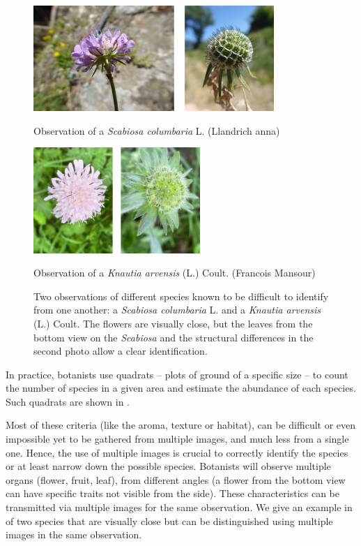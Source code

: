 \begin{figure}[bth]
        \centering
        \begin{minipage}[b]{0.49\textwidth}
            \centering
            \includegraphics[width=\textwidth,height=4cm]{./images_plantnet/scabiosa.jpg}
            \caption*{Observation of a \emph{Scabiosa columbaria} L. (\textcopyright Llandrich anna)}
        \end{minipage}
        \hfill
        \begin{minipage}[b]{0.49\textwidth}
            \centering
            \includegraphics[width=\textwidth,height=4cm]{./images_plantnet/knautia.jpg}
            \caption*{Observation of a \emph{Knautia arvensis} (L.) Coult. (\textcopyright Francois Mansour)}
        \end{minipage}
        \caption{Two observations of different species known to be difficult to identify from one another: a \emph{Scabiosa columbaria} L. and a \emph{Knautia arvensis} (L.) Coult. The flowers are visually close, but the leaves from the bottom view on the \emph{Scabiosa} and the structural differences in the second photo allow a clear identification.}
        \label{fig:scabiosa-knautia}
    \end{figure}

In practice, botanists use quadrats -- plots of ground of a specific size -- to count the number of species in a given area and estimate the abundance of each species. Such quadrats are shown in .


Most of these criteria (like the aroma, texture or habitat), can be difficult or even impossible yet to be gathered from multiple images, and much less from a single one.
Hence, the use of multiple images is crucial to correctly identify the species or at least narrow down the possible species.
Botanists will observe multiple organs (flower, fruit, leaf), from different angles (a flower from the bottom view can have specific traits not visible from the side).
These characteristics can be transmitted via multiple images for the same observation.
We give an example in  of two species that are visually close but can be distinguished using multiple images in the same observation.

